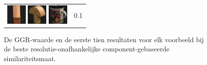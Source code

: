 \begin{figure}[tbp]
\begin{center}
\begin{tabular}{m{11cm} | m{3cm} |}
\includegraphics[width=1cm]{coil/beeld-44.eps}
\includegraphics[width=1cm]{coil/beeld-4.eps}
\includegraphics[width=1cm]{coil/beeld-64.eps}
& {\scriptsize 0.1}
\\
\end{tabular}
\caption{\label{fig:results_beste_componenten_pixelgeb}De GGR-waarde en de eerste tien resultaten voor elk voorbeeld bij de beste resolutie-onafhankelijke component-gebaseerde similariteitsmaat.}
\end{center}
\end{figure}

